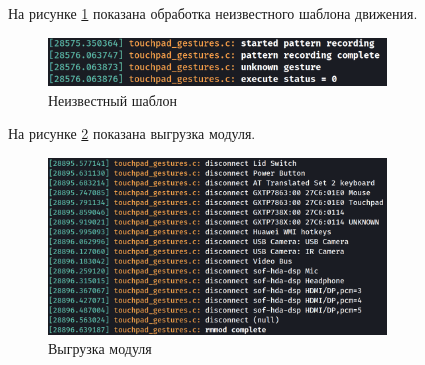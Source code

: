 На рисунке \ref{fig:unknown_gesture} показана обработка неизвестного шаблона движения.

\begin{figure}[H]
	\centering
	\includegraphics[width=0.8\textwidth]{inc/unknown_gesture.png}
	\caption{Неизвестный шаблон}
	\label{fig:unknown_gesture}
\end{figure}

На рисунке \ref{fig:rmmod} показана выгрузка модуля.

\begin{figure}[H]
	\centering
	\includegraphics[width=0.8\textwidth]{inc/rmmod.png}
	\caption{Выгрузка модуля}
	\label{fig:rmmod}
\end{figure}

\clearpage